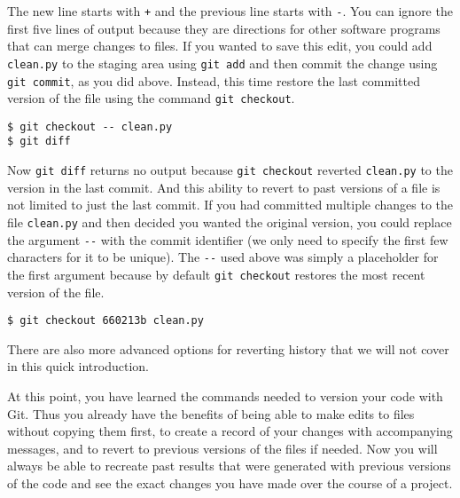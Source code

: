 The new line starts with \verb|+| and the previous line starts with \verb|-|.
You can ignore the first five lines of output because they are directions for other software programs that can merge changes to files.
If you wanted to save this edit, you could add \verb|clean.py| to the staging area using \verb|git add| and then commit the change using \verb|git commit|, as you did above.
Instead, this time restore the last committed version of the file using the command \verb|git checkout|.

\begin{lstlisting}
$ git checkout -- clean.py
$ git diff
\end{lstlisting}

Now \verb|git diff| returns no output because \verb|git checkout| reverted \verb|clean.py| to the version in the last commit.
And this ability to revert to past versions of a file is not limited to just the last commit.
If you had committed multiple changes to the file \verb|clean.py| and then decided you wanted the original version, you could replace the argument \verb|--| with the commit identifier (we only need to specify the first few characters for it to be unique).
The \verb|--| used above was simply a placeholder for the first argument because by default \verb|git checkout| restores the most recent version of the file.

\begin{lstlisting}
$ git checkout 660213b clean.py
\end{lstlisting}

There are also more advanced options for reverting history that we will not cover in this quick introduction.

At this point, you have learned the commands needed to version your code with Git.
Thus you already have the benefits of being able to make edits to files without copying them first, to create a record of your changes with accompanying messages, and to revert to previous versions of the files if needed.
Now you will always be able to recreate past results that were generated with previous versions of the code and see the exact changes you have made over the course of a project.
  